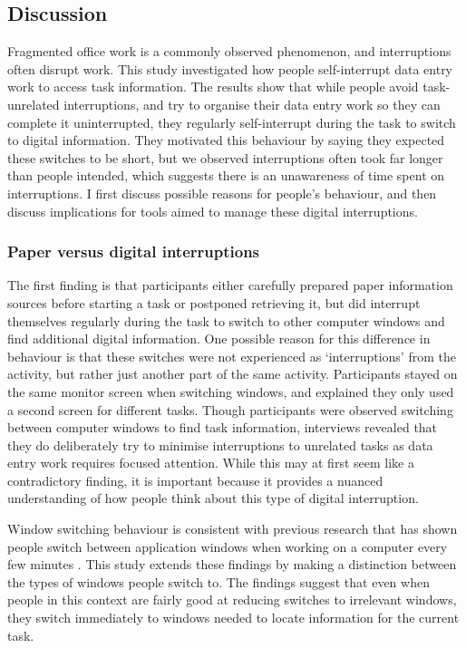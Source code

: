 \subsection{Discussion}
Fragmented office work is a commonly observed phenomenon, and interruptions often disrupt work. This study investigated how people self-interrupt data entry work to access task information. The results show that while people avoid task-unrelated interruptions, and try to organise their data entry work so they can complete it uninterrupted, they regularly self-interrupt during the task to switch to digital information. They motivated this behaviour by saying they expected these switches to be short, but we observed interruptions often took far longer than people intended, which suggests there is an unawareness of time spent on interruptions. I first discuss possible reasons for people's behaviour, and then discuss implications for tools aimed to manage these digital interruptions. 

\subsubsection{Paper versus digital interruptions}
The first finding is that participants either carefully prepared paper information sources before starting a task or postponed retrieving it, but did interrupt themselves regularly during the task to switch to other computer windows and find additional digital information. One possible reason for this difference in behaviour is that these switches were not experienced as ‘interruptions’ from the activity, but rather just another part of the same activity. Participants stayed on the same monitor screen when switching windows, and explained they only used a second screen for different tasks. Though participants were observed switching between computer windows to find task information, interviews revealed that they do deliberately try to minimise interruptions to unrelated tasks as data entry work requires focused attention. While this may at first seem like a contradictory finding, it is important because it provides a nuanced understanding of how people think about this type of digital interruption. 

Window switching behaviour is consistent with previous research that has shown people switch between application windows when working on a computer every few minutes \citep{Gonzalez2004}. This study extends these findings by making a distinction between the types of windows people switch to. The findings suggest that even when people in this context are fairly good at reducing switches to irrelevant windows, they switch immediately to windows needed to locate information for the current task. 

